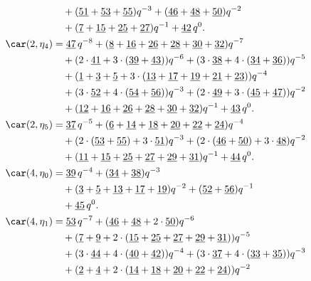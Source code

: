 \begin{align*}
	&\quad+(\underline{51}+\underline{53}+\underline{55})q^{-3}+(\underline{46}+\underline{48}+\underline{50})q^{-2}\\
	&\quad+(\underline{7}+\underline{15}+\underline{25}+\underline{27})q^{-1}+\underline{42}\,q^0.\\
	\car(2,\eta_{4})
	&=\underline{47}\,q^{-8}+(\underline{8}+\underline{16}+\underline{26}+\underline{28}+\underline{30}+\underline{32})q^{-7}\\
	&\quad+(2\cdot\underline{41}+3\cdot(\underline{39}+\underline{43}))q^{-6}+(3\cdot\underline{38}+4\cdot(\underline{34}+\underline{36}))q^{-5}\\
	&\quad+(\underline{1}+\underline{3}+\underline{5}+3\cdot(\underline{13}+\underline{17}+\underline{19}+\underline{21}+\underline{23}))q^{-4}\\
	&\quad+(3\cdot\underline{52}+4\cdot(\underline{54}+\underline{56}))q^{-3}+(2\cdot\underline{49}+3\cdot(\underline{45}+\underline{47}))q^{-2}\\
	&\quad+(\underline{12}+\underline{16}+\underline{26}+\underline{28}+\underline{30}+\underline{32})q^{-1}+\underline{43}\,q^0.\\
	\car(2,\eta_{5})
	&=\underline{37}\,q^{-5}+(\underline{6}+\underline{14}+\underline{18}+\underline{20}+\underline{22}+\underline{24})q^{-4}\\
	&\quad+(2\cdot(\underline{53}+\underline{55})+3\cdot\underline{51})q^{-3}+(2\cdot(\underline{46}+\underline{50})+3\cdot\underline{48})q^{-2}\\
	&\quad+(\underline{11}+\underline{15}+\underline{25}+\underline{27}+\underline{29}+\underline{31})q^{-1}+\underline{44}\,q^0.\\
	\car(4,\eta_{0})
	&=\underline{39}\,q^{-4}+(\underline{34}+\underline{38})q^{-3}\\
	&\quad+(\underline{3}+\underline{5}+\underline{13}+\underline{17}+\underline{19})q^{-2}+(\underline{52}+\underline{56})q^{-1}\\
	&\quad+\underline{45}\,q^0.\\
	\car(4,\eta_{1})
	&=\underline{53}\,q^{-7}+(\underline{46}+\underline{48}+2\cdot\underline{50})q^{-6}\\
	&\quad+(\underline{7}+\underline{9}+2\cdot(\underline{15}+\underline{25}+\underline{27}+\underline{29}+\underline{31}))q^{-5}\\
	&\quad+(3\cdot\underline{44}+4\cdot(\underline{40}+\underline{42}))q^{-4}+(3\cdot\underline{37}+4\cdot(\underline{33}+\underline{35}))q^{-3}\\
	&\quad+(\underline{2}+\underline{4}+2\cdot(\underline{14}+\underline{18}+\underline{20}+\underline{22}+\underline{24}))q^{-2}\\

\end{align*}

